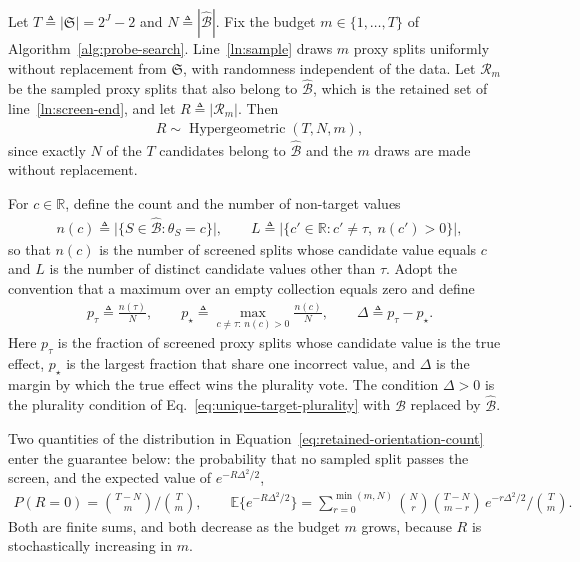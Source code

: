 Let $T\triangleq|\mathfrak S|=2^J-2$ and $N\triangleq|\widehat{\mathcal B}|$. Fix the budget $m\in\{1,\ldots,T\}$ of Algorithm~\ref{alg:probe-search}. Line~\ref{ln:sample} draws $m$ proxy splits uniformly without replacement from $\mathfrak S$, with randomness independent of the data. Let $\mathcal R_m$ be the sampled proxy splits that also belong to $\widehat{\mathcal B}$, which is the retained set of line~\ref{ln:screen-end}, and let $R\triangleq|\mathcal R_m|$. Then
\begin{align}
	R\sim\operatorname{Hypergeometric}(T,N,m),
\label{eq:retained-orientation-count}
\end{align}
since exactly $N$ of the $T$ candidates belong to $\widehat{\mathcal B}$ and the $m$ draws are made without replacement.

For $c\in\mathbb R$, define the count and the number of non-target values
\begin{align}\label{eq:population-orientation-count}
	n(c)\triangleq\bigl|\{S\in\widehat{\mathcal B}:\theta_S=c\}\bigr|,
	\qquad L\triangleq\bigl|\{c'\in\mathbb R:c'\ne\tau,\ n(c')>0\}\bigr|,
\end{align}
 so that $n(c)$ is the number of screened splits whose candidate value equals $c$ and $L$ is the number of distinct candidate values other than $\tau$.
 Adopt the convention that a maximum over an empty collection equals zero and define
\begin{align}\label{eq:population-plurality-gap}
	p_\tau
	\triangleq
	\frac{n(\tau)}{N},
	\qquad
	p_\star
	\triangleq
	\max_{c\ne\tau:\,n(c)>0}\frac{n(c)}{N},
	\qquad
	\Delta\triangleq p_\tau-p_\star.
\end{align}
Here $p_\tau$ is the fraction of screened proxy splits whose candidate value is the true effect, $p_\star$ is the largest fraction that share one incorrect value, and $\Delta$ is the margin by which the true effect wins the plurality vote. The condition $\Delta>0$ is the plurality condition of Eq.~\eqref{eq:unique-target-plurality} with $\mathcal B$ replaced by $\widehat{\mathcal B}$.

Two quantities of the distribution in Equation~\eqref{eq:retained-orientation-count} enter the guarantee below: the probability that no sampled split passes the screen, and the expected value of $e^{-R\Delta^2/2}$,
\begin{align}\label{eq:sampling-failure-terms}
	P(R=0)=\binom{T-N}{m}\Big/\binom{T}{m},
	\qquad
	\mathbb E\bigl\{e^{-R\Delta^2/2}\bigr\}
	=\sum_{r=0}^{\min(m,N)}\binom{N}{r}\binom{T-N}{m-r}\,e^{-r\Delta^2/2}\Big/\binom{T}{m}.
\end{align}
Both are finite sums, and both decrease as the budget $m$ grows, because $R$ is stochastically increasing in $m$.

